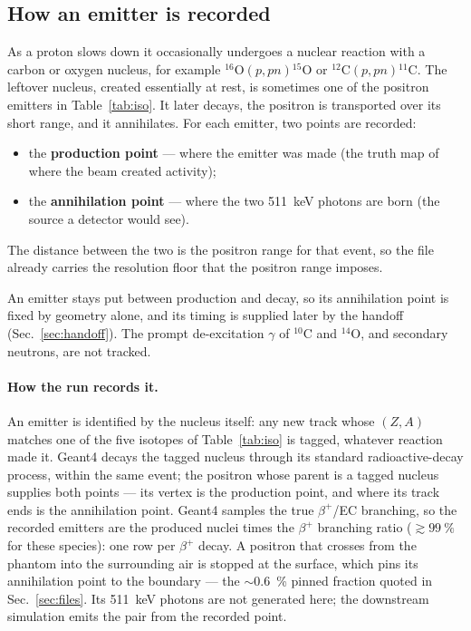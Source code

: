\documentclass[11pt]{article}
\newcommand{\bplus}{\beta^{+}}
\newcommand{\Cl}[1]{{}^{#1}\mathrm{C}}
\newcommand{\Ox}[1]{{}^{#1}\mathrm{O}}
\begin{document}
\subsection{How an emitter is recorded}
\label{sec:production}
As a proton slows down it occasionally undergoes a nuclear reaction with a carbon
or oxygen nucleus, for example $\Ox{16}(p,pn)\Ox{15}$ or $\Cl{12}(p,pn)\Cl{11}$.
The leftover nucleus, created essentially at rest, is sometimes one of the positron
emitters in Table~\ref{tab:iso}. It later decays, the positron is transported over
its short range, and it annihilates. For each emitter, two points are recorded:
\begin{itemize}[nosep]
\item the \textbf{production point} --- where the emitter was made (the truth map
of where the beam created activity);
\item the \textbf{annihilation point} --- where the two \SI{511}{keV} photons are
born (the source a detector would see).
\end{itemize}
The distance between the two is the positron range for that event, so the file
already carries the resolution floor that the positron range imposes.

An emitter stays put between production and decay, so its annihilation point is
fixed by geometry alone, and its timing is supplied later by the handoff
(Sec.~\ref{sec:handoff}). The prompt de-excitation $\gamma$ of $\Cl{10}$ and
$\Ox{14}$, and secondary neutrons, are not tracked.

\paragraph{How the run records it.} An emitter is identified by the nucleus
itself: any new track whose $(Z,A)$ matches one of the five isotopes of
Table~\ref{tab:iso} is tagged, whatever reaction made it. Geant4 decays the
tagged nucleus through its standard radioactive-decay process, within the same
event; the positron whose parent is a tagged nucleus supplies both points ---
its vertex is the production point, and where its track ends is the
annihilation point. Geant4 samples the true $\bplus$/EC branching, so the
recorded emitters are the produced nuclei times the $\bplus$ branching ratio
($\gtrsim\SI{99}{\percent}$ for these species): one row per $\bplus$ decay. A
positron that crosses from the phantom into the surrounding air is stopped at
the surface, which pins its annihilation point to the boundary --- the
$\sim$\SI{0.6}{\percent} pinned fraction quoted in Sec.~\ref{sec:files}. Its
\SI{511}{keV} photons are not generated here; the downstream simulation emits
the pair from the recorded point.
\end{document}
